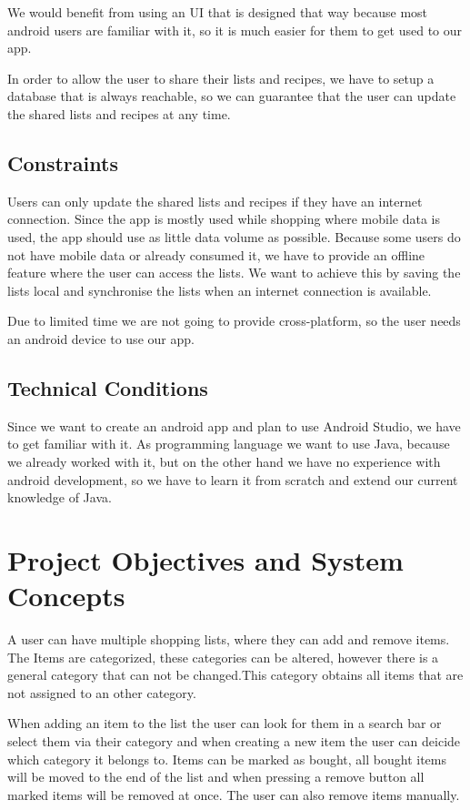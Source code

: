 \documentclass[12pt]{article}
\theoremstyle{definition}
\begin{document}
We would benefit from using an UI that is designed that way because most android users are familiar with it, so it is much easier for them to get used to our app.

In order to allow the user to share their lists and recipes, we have to setup a database that is always reachable, so we can guarantee that the user can update the shared lists and recipes at any time.

\subsection{Constraints}
Users can only update the shared lists and recipes if they have an internet connection. Since the app is mostly used while shopping where mobile data is used, the app should use as little data volume as possible. Because some users do not have mobile data or already consumed it, we have to provide an offline feature where the user can access the lists. We want to achieve this by saving the lists local and synchronise the lists when an internet connection is available.

Due to limited time we are not going to provide cross-platform, so the user needs an android device to use our app.
\subsection{Technical Conditions}
Since we want to create an android app and plan to use Android Studio, we have to get familiar with it. As programming language we want to use Java, because we already worked with it, but on the other hand we have no experience with android development, so we have to learn it from scratch and extend our current knowledge of Java.
\pagebreak

\section{Project Objectives and System Concepts}
A user can have multiple shopping lists, where they can add and remove items. The Items are categorized, these categories can be altered, however there is a general category that can not be changed.This category obtains all items that are not assigned to an other category.

When adding an item to the list the user can look for them in a search bar or select them via their category and when creating a new item the user can deicide which category it belongs to. Items can be marked as bought, all bought items will be moved to the end of the list and when pressing a remove button all marked items will be removed at once. The user can also remove items manually.
\end{document}

